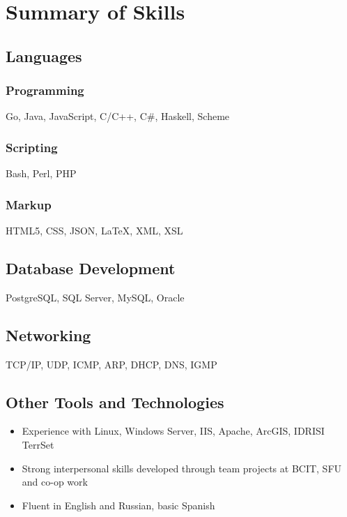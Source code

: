 \documentclass{ik_resume}
\begin{document}
\thispagestyle{empty}




\section{Summary of Skills}

\subsection{Languages}

\subsubsection{Programming}

Go, Java, JavaScript, C/C++, C\#, Haskell, Scheme

\subsubsection{Scripting}

Bash, Perl, PHP

\subsubsection{Markup}

HTML5, CSS, JSON, {\LaTeX}, XML, XSL

\subsection{Database Development}

PostgreSQL, SQL Server, MySQL, Oracle

\subsection{Networking}

TCP/IP, UDP, ICMP, ARP, DHCP, DNS, IGMP

\subsection{Other Tools and Technologies}

\begin{itemize}
  \itemsep0em
  \item Experience with Linux, Windows Server, IIS, Apache, ArcGIS, IDRISI TerrSet
  \item Strong interpersonal skills developed through team projects at BCIT, SFU and co-op work
  \item Fluent in English and Russian, basic Spanish
\end{itemize}
\end{document}

